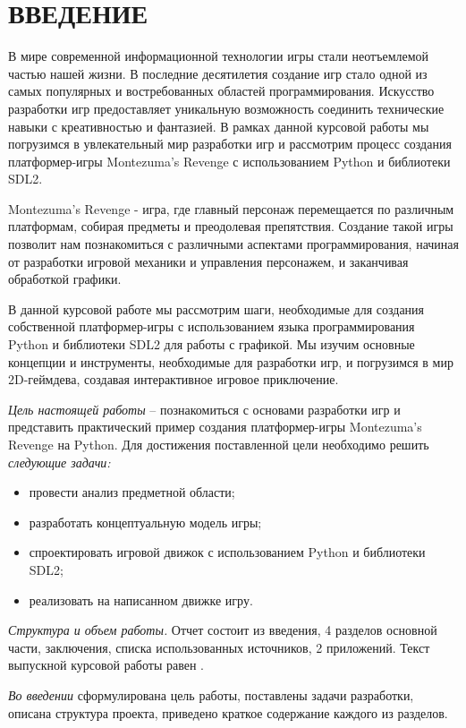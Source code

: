 \section*{ВВЕДЕНИЕ}


В мире современной информационной технологии игры стали неотъемлемой частью нашей жизни. В последние десятилетия создание игр стало одной из самых популярных и востребованных областей программирования. Искусство разработки игр предоставляет уникальную возможность соединить технические навыки с креативностью и фантазией. В рамках данной курсовой работы мы погрузимся в увлекательный мир разработки игр и рассмотрим процесс создания платформер-игры Montezuma’s Revenge с использованием Python и библиотеки SDL2.

Montezuma’s Revenge - игра, где главный персонаж перемещается по различным платформам, собирая предметы и преодолевая препятствия. Создание такой игры позволит нам познакомиться с различными аспектами программирования, начиная от разработки игровой механики и управления персонажем, и заканчивая обработкой графики.

В данной курсовой работе мы рассмотрим шаги, необходимые для создания собственной платформер-игры с использованием языка программирования Python и библиотеки SDL2 для работы с графикой. Мы изучим основные концепции и инструменты, необходимые для разработки игр, и погрузимся в мир 2D-геймдева, создавая интерактивное игровое приключение.


\emph{Цель настоящей работы} –  познакомиться с основами разработки игр и представить практический пример создания платформер-игры Montezuma’s Revenge на Python. Для достижения поставленной цели необходимо решить \emph{следующие задачи:}
\begin{itemize}
\item провести анализ предметной области;
\item разработать концептуальную модель игры;
\item спроектировать игровой движок с использованием Python и библиотеки SDL2;
\item реализовать на написанном движке игру.
\end{itemize}

\emph{Структура и объем работы.} Отчет состоит из введения, 4 разделов основной части, заключения, списка использованных источников, 2 приложений. Текст выпускной курсовой работы равен .

\emph{Во введении} сформулирована цель работы, поставлены задачи разработки, описана структура проекта, приведено краткое содержание каждого из разделов.


